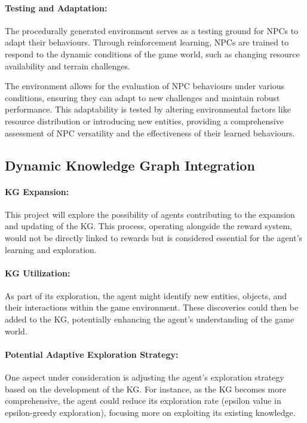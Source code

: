 \paragraph{Testing and Adaptation:}
The procedurally generated environment serves as a testing ground for NPCs to adapt their behaviours. Through reinforcement learning, NPCs are trained to respond to the dynamic conditions of the game world, such as changing resource availability and terrain challenges.

The environment allows for the evaluation of NPC behaviours under various conditions, ensuring they can adapt to new challenges and maintain robust performance. This adaptability is tested by altering environmental factors like resource distribution or introducing new entities, providing a comprehensive assessment of NPC versatility and the effectiveness of their learned behaviours.

\subsection{Dynamic Knowledge Graph Integration}
\paragraph{KG Expansion:}
This project will explore the possibility of agents contributing to the expansion and updating of the KG. This process, operating alongside the reward system, would not be directly linked to rewards but is considered essential for the agent's learning and exploration.

\paragraph{KG Utilization:}
As part of its exploration, the agent might identify new entities, objects, and their interactions within the game environment. These discoveries could then be added to the KG, potentially enhancing the agent's understanding of the game world.

\paragraph{Potential Adaptive Exploration Strategy:}
One aspect under consideration is adjusting the agent's exploration strategy based on the development of the KG. For instance, as the KG becomes more comprehensive, the agent could reduce its exploration rate (epsilon value in epsilon-greedy exploration), focusing more on exploiting its existing knowledge.

